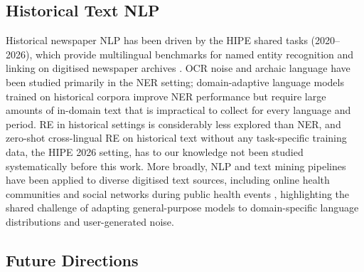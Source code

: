 \documentclass[
]{ceurart}
\theoremstyle{definition}
\begin{document}
\subsection{Historical Text NLP}

Historical newspaper NLP has been driven by the HIPE shared tasks (2020--2026), which provide multilingual benchmarks for named entity recognition and linking on digitised newspaper archives \citep{ehrmann2020hipe,ehrmann2022hipe}.
OCR noise and archaic language have been studied primarily in the NER setting; domain-adaptive language models trained on historical corpora improve NER performance \citep{schweter2021hmbert} but require large amounts of in-domain text that is impractical to collect for every language and period.
RE in historical settings is considerably less explored than NER, and zero-shot cross-lingual RE on historical text without any task-specific training data, the HIPE 2026 setting, has to our knowledge not been studied systematically before this work.
More broadly, NLP and text mining pipelines have been applied to diverse digitised text sources, including online health communities and social networks during public health events \citep{keinan2024analysis,keinan2025impacts}, highlighting the shared challenge of adapting general-purpose models to domain-specific language distributions and user-generated noise.

\subsection{Future Directions}
\end{document}
